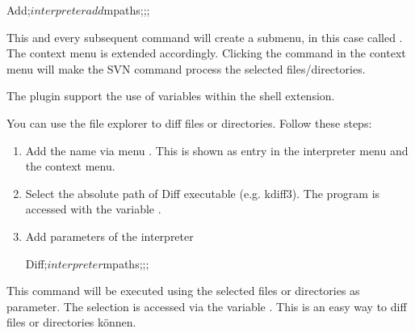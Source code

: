 \begin{code}
 Add;$interpreter add $mpaths;;;
\end{code}

This and every subsequent command will create a submenu, in this case called . The context menu is extended accordingly. Clicking the command in the context menu will make the SVN command  process the selected files/directories.

The plugin support the use of \codeblocks variables within the shell extension.



You can use the file explorer to diff files or directories. Follow these steps:

\begin{enumerate}
\item Add the name via menu . This is shown as entry in the interpreter menu and the context menu.
\item Select the absolute path of Diff executable (e.g. kdiff3). The program is accessed with the variable .
\item Add parameters of the interpreter
\begin{cmd}
Diff;$interpreter $mpaths;;;
\end{cmd}
\end{enumerate}

This command will be executed using the selected files or directories as parameter. The selection is accessed via the variable . This is an easy way to diff files or directories können.

